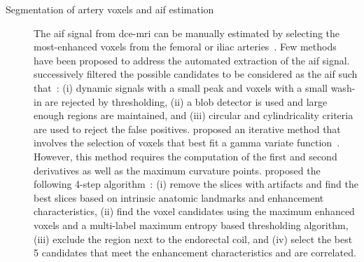 \begin{description}
  \item[Segmentation of artery voxels and \ac{aif} estimation] The \ac{aif} signal from \ac{dce}-\ac{mri} can be manually estimated by selecting the most-enhanced voxels from the femoral or iliac arteries~\cite{meng2010comparison}.
    Few methods have been proposed to address the automated extraction
    of the \ac{aif} signal.
    \citeauthor{chen2008automatic} successively filtered the possible
    candidates to be considered as the \ac{aif} such that~\cite{chen2008automatic}:
    (i) dynamic signals with a small peak and voxels with a small wash-in are rejected by thresholding,
    (ii) a blob detector is used and large enough regions are maintained, and
    (iii) circular and cylindricality criteria are used to reject the false positives.
    \citeauthor{zhu2011automated} proposed an iterative method that
    involves the selection of voxels that best fit a gamma variate function~\cite{zhu2011automated}.
    However, this method requires the computation of the first and
    second derivatives as well as the maximum curvature points.
    \citeauthor{shanbhag2012generalized} proposed the following 4-step algorithm~\cite{shanbhag2012generalized,fennessy2015quantitative}:
    (i) remove the slices with artifacts and find the best slices based on intrinsic anatomic landmarks and enhancement characteristics,
    (ii) find the voxel candidates using the maximum enhanced voxels and a multi-label maximum entropy based thresholding algorithm,
    (iii) exclude the region next to the endorectal coil, and
    (iv) select the best 5 candidates that meet the enhancement characteristics and are correlated.


\end{description}
